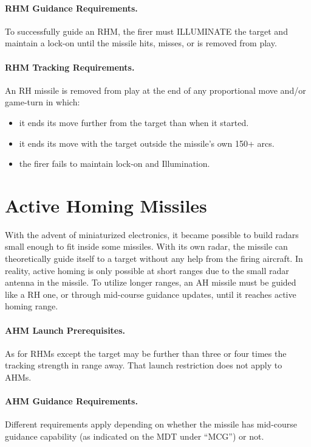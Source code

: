 \paragraph{RHM Guidance Requirements.} To successfully guide an RHM, the firer must ILLUMINATE the target and maintain a lock-on until the missile hits, misses, or is removed from play.

\paragraph{RHM Tracking Requirements.} An RH missile is removed from play at the end of any proportional move and/or game-turn in which:

\begin{itemize}

    \item it ends its move further from the target than when it started.

    \item it ends its move with the target outside the missile's own 150+ arcs.

    \item the firer fails to maintain lock-on and Illumination.

\end{itemize}

\section{Active Homing Missiles}
\label{rule:active-radar-homing-missiles}

With the advent of miniaturized electronics, it became possible to build radars small enough to fit inside some missiles. With its own radar, the missile can theoretically guide itself to a target without any help from the firing aircraft. In reality, active homing is only possible at short ranges due to the small radar antenna in the missile. To utilize longer ranges, an AH missile must be guided like a RH one, or through mid-course guidance updates, until it reaches active homing range.

\paragraph{AHM Launch Prerequisites.} As for RHMs except the target may be further than three or four  times the tracking strength in range away. That launch restriction does not apply to AHMs.

\paragraph{AHM Guidance Requirements.} Different requirements apply depending on whether the missile has mid-course guidance capability (as indicated on the MDT under “MCG”) or not.

